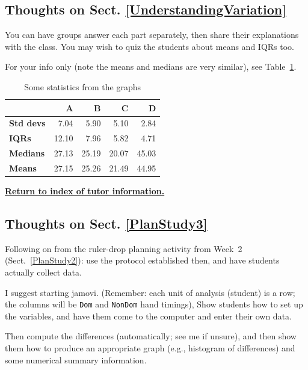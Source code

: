 \documentclass[
  11pt,
  a4paper,
  krantz2]{krantz}
\begin{document}
\subsection{Thoughts on Sect. \ref{UnderstandingVariation}}\label{thoughts-on-sect.-refunderstandingvariation}

You can have groups answer each part separately, then share their explanations with the class.
You may wish to quiz the students about means and IQRs too.

For your info only (note the means and medians are very similar), see Table~\ref{tab:NumericalSummaryAns}.

\begin{table}
\centering
\caption{\label{tab:NumericalSummaryAns}Some statistics from the graphs}
\centering
\begin{tabular}[t]{>{}lrrrr}
\toprule
\textbf{ } & \textbf{A} & \textbf{B} & \textbf{C} & \textbf{D}\\
\midrule
\textbf{Std devs} & 7.04 & 5.90 & 5.10 & 2.84\\
\textbf{IQRs} & 12.10 & 7.96 & 5.82 & 4.71\\
\textbf{Medians} & 27.13 & 25.19 & 20.07 & 45.03\\
\textbf{Means} & 27.15 & 25.26 & 21.49 & 44.95\\
\bottomrule
\end{tabular}
\end{table}

\href{TutorInfo.html}{\textbf{Return to index of tutor information.}}

\subsection{Thoughts on Sect. \ref{PlanStudy3}}\label{thoughts-on-sect.-refplanstudy3}

Following on from the ruler-drop planning activity from Week~2 (Sect.~\ref{PlanStudy2}): use the protocol established then, and have students actually collect data.

I suggest starting jamovi.
(Remember: each unit of analysis (student) is a row; the columns will be \texttt{Dom} and \texttt{NonDom} hand timings),
Show students how to set up the variables, and have them come to the computer and enter their own data.

Then compute the differences (automatically; see me if unsure), and then show them how to produce an appropriate graph (e.g., histogram of differences) and some numerical summary information.
\end{document}
